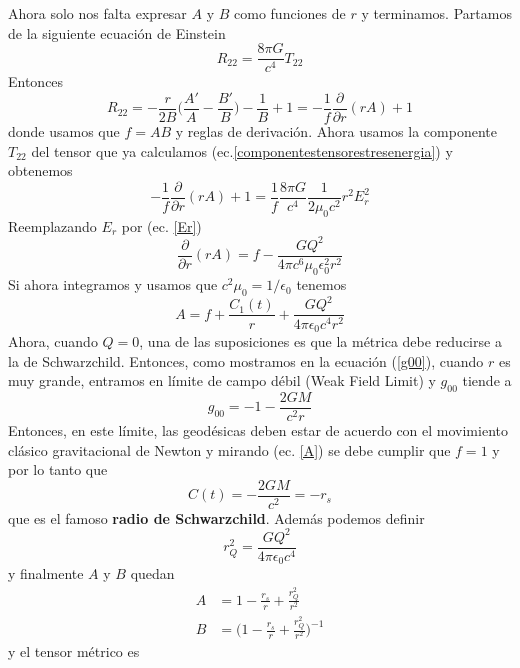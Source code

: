 Ahora solo nos falta expresar $A$ y $B$ como funciones de $r$ y terminamos. Partamos de la siguiente ecuación de Einstein
\begin{equation}
    R_{22} = \frac{8\pi G}{c^4} T_{22}
\end{equation}
Entonces
\begin{equation}
R_{22} = -\frac{r}{2B}\biggr(\frac{A'}{A} - \frac{B'}{B}\biggr) - \frac{1}{B}+1 = -\frac{1}{f}\frac{\partial}{\partial r}(rA) +1
\end{equation}
donde usamos que $f=AB$ y reglas de derivación. Ahora usamos la componente $T_{22}$ del tensor que ya calculamos (ec.\ref{componentestensorestresenergia}) y obtenemos
\begin{equation}
-\frac{1}{f} \frac{\partial}{\partial r}(rA) +1 = \frac{1}{f}\frac{8\pi G}{c^4} \frac{1}{2\mu_0 c^2} r^2 E_r^2
\end{equation}
Reemplazando $E_r$ por (ec. \ref{Er}) 
\begin{equation}
\frac{\partial}{\partial r} (rA) = f - \frac{GQ^2}{4\pi c^6 \mu_0 \epsilon_0^2r^2}
\end{equation}
Si ahora integramos y usamos que $c^2\mu_0= 1/\epsilon_0$ tenemos
\begin{equation}
    A = f + \frac{C_1(t)}{r} + \frac{GQ^2}{4\pi \epsilon_0 c^4 r^2}
    \label{A}
\end{equation}
Ahora, cuando $Q=0$, una de las suposiciones es que la métrica debe reducirse a la de Schwarzchild. Entonces, como mostramos en la ecuación (\ref{g00}), cuando $r$ es muy grande, entramos en límite de campo débil (Weak Field Limit) y $g_{00}$ tiende a 
\begin{equation*}
g_{00} = -1 - \frac{2GM}{c^2 r}
\end{equation*}
Entonces, en este límite, las geodésicas deben estar de acuerdo con el movimiento clásico gravitacional de Newton y mirando (ec. \ref{A}) se debe cumplir que $f=1$ y por lo tanto que 
\begin{equation}
C(t)= -\frac{2GM}{c^2} =- r_s
\end{equation}
que es el famoso \textbf{radio de Schwarzchild}. Además podemos definir 
\begin{equation}
    r_Q^2 = \frac{GQ^2}{4\pi\epsilon_0 c^4}
\end{equation}
y finalmente $A$ y $B$ quedan
\begin{equation}
\begin{split}
A &= 1 - \frac{r_s}{r} + \frac{r_Q^2}{r^2} \\
B &= \biggr(1 - \frac{r_s}{r} + \frac{r_Q^2}{r^2}\biggr)^{-1}
\end{split}
\end{equation}
y el tensor métrico es 

